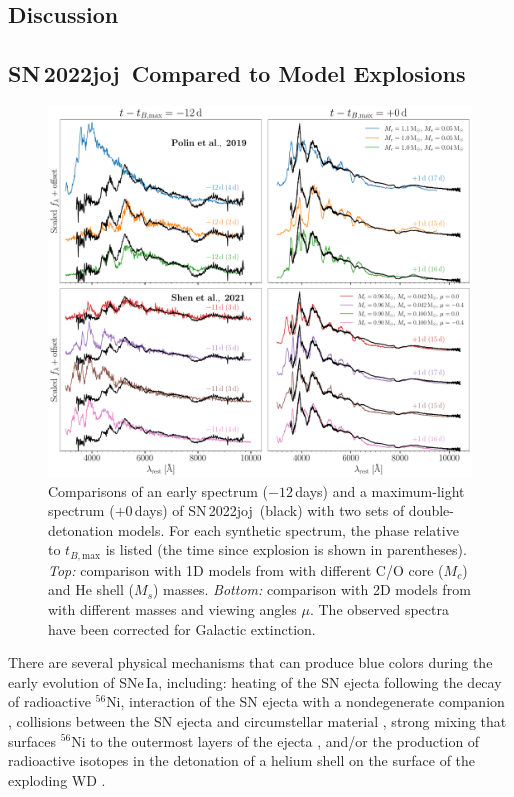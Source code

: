 \documentclass[twocolumn]{aastex631}
\newcommand{\sn}{SN\,2022joj}
\begin{document}
\begin{CJK*}{UTF8}{gbsn}
\section{Discussion} \label{sec:discussion}
\subsection{\sn\ Compared to Model Explosions} \label{sec:model}

\begin{figure}
    \centering
    \includegraphics[width=\linewidth]{model_comparison_spec.pdf}
    \caption{Comparisons of an early spectrum ($-12$\,days) and a maximum-light spectrum ($+0$\,days) of \sn\ (black) with two sets of double-detonation models. For each synthetic spectrum, the phase relative to $t_{B,\mathrm{max}}$  is listed (the time since explosion is shown in parentheses). \textit{Top:} comparison with 1D models from \citet{polin_observational_2019} with different C/O core ($M_c$) and He shell ($M_s$) masses. \textit{Bottom:} comparison with 2D models from \citet{Shen_2D_2021} with different masses and viewing angles $\mu$. The observed spectra have been corrected for Galactic extinction.
    }
    \label{fig:model_spec}
\end{figure}

There are several physical mechanisms that can produce blue colors during the early evolution of SNe\,Ia, including: heating of the SN ejecta following the decay of radioactive $^{56}$Ni, interaction of the SN ejecta with a nondegenerate companion \citep[e.g.,][]{Kasen_2010}, collisions between the SN ejecta and circumstellar material \citep[e.g.,][]{Piro_2016}, strong mixing that surfaces $^{56}$Ni to the outermost layers of the ejecta \citep[e.g.,][]{Piro_2013,Magee_2020}, and/or the production of radioactive isotopes in the detonation of a helium shell on the surface of the exploding WD \citep[e.g.,][]{Noebauer_2017,polin_observational_2019}.


\end{CJK*}
\end{document}
